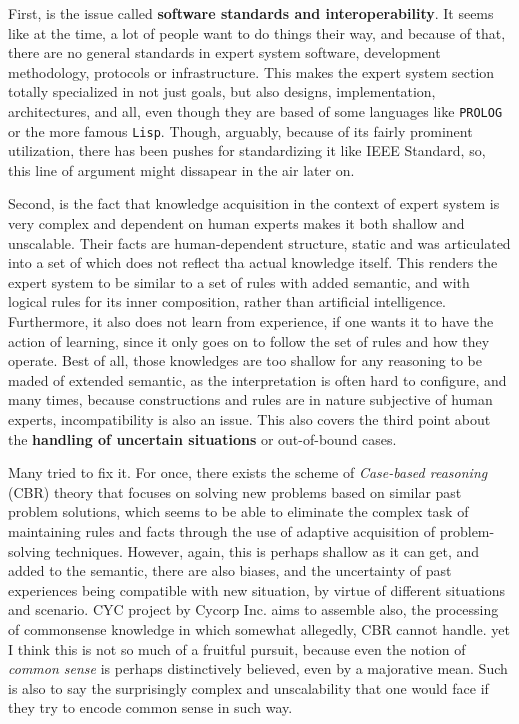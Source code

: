 First, is the issue called \textbf{software standards and interoperability}. It seems like at the time, a lot of people want to do things their way, and because of that, there are no general standards in expert system software, development methodology, protocols or infrastructure. This makes the expert system section totally specialized in not just goals, but also designs, implementation, architectures, and all, even though they are based of some languages like \texttt{PROLOG} or the more famous \texttt{Lisp}. Though, arguably, because of its fairly prominent utilization, there has been pushes for standardizing it like IEEE Standard, so, this line of argument might dissapear in the air later on. 

Second, is the fact that knowledge acquisition in the context of expert system is very complex and dependent on human experts makes it both shallow and unscalable. Their facts are human-dependent structure, static and was articulated into a set of which does not reflect tha actual knowledge itself. This renders the expert system to be similar to a set of rules with added semantic, and with logical rules for its inner composition, rather than artificial intelligence. Furthermore, it also does not learn from experience, if one wants it to have the action of learning, since it only goes on to follow the set of rules and how they operate. Best of all, those knowledges are too shallow for any reasoning to be maded of extended semantic, as the interpretation is often hard to configure, and many times, because constructions and rules are in nature subjective of human experts, incompatibility is also an issue. This also covers the third point about the \textbf{handling of uncertain situations} or out-of-bound cases. 

Many tried to fix it. For once, there exists the scheme of \textit{Case-based reasoning} (CBR) theory that focuses on solving new problems based on similar past problem solutions, which seems to be able to eliminate the complex task of maintaining rules and facts through the use of adaptive acquisition of problem-solving techniques. However, again, this is perhaps shallow as it can get, and added to the semantic, there are also biases, and the uncertainty of past experiences being compatible with new situation, by virtue of different situations and scenario. CYC project by Cycorp Inc. aims to assemble also, the processing of commonsense knowledge in which somewhat allegedly, CBR cannot handle. yet I think this is not so much of a fruitful pursuit, because even the notion of \textit{common sense} is perhaps distinctively believed, even by a majorative mean. Such is also to say the surprisingly complex and unscalability that one would face if they try to encode common sense in such way. 

